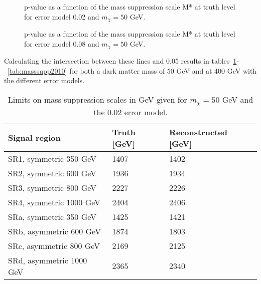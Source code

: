  \begin{figure}[H] %
    \hfill
    \caption{p-value as a function of the mass suppression scale M* at truth level for error model 0.02 and $m_{\chi}=50$ GeV.}
    \label{fig:SRnewMt}
  \end{figure}
\newpage
 \begin{figure}[H] %
    \hfill
    \caption{p-value as a function of the mass suppression scale M* at truth level for error model 0.08 and $m_{\chi}=50$ GeV.}
    \label{fig:SRnewMr}
  \end{figure}

Calculating the intersection between these lines and 0.05 results in tables~\ref{tab:masssupp002}-~\ref{tab:masssupp2010} for both a dark matter mass of 50 GeV and at 400 GeV with the different error models.

\begin{table}[ht]
\begin{center}
\begin{tabular}{|l|l|l|}
\hline
Signal region & Truth [GeV]& Reconstructed [GeV]\\ \hline
SR1, symmetric 350 GeV &1407&1402\\
SR2, symmetric 600 GeV&1936&1934\\
SR3, symmetric 800 GeV&2227&2226\\
SR4, symmetric 1000 GeV&2404&2406\\ \hline
SRa, symmetric 350 GeV &1425&1421\\
SRb, asymmetric 600 GeV &1874&1803\\
SRc, asymmetric 800 GeV&2169&2125\\
SRd, asymmetric 1000 GeV&2365&2340\\ \hline
\end{tabular}
\caption{Limits on mass suppression scales in GeV given for $m_{\chi}=50$ GeV and the 0.02 error model.}
\label{tab:masssupp002}
\end{center}
\end{table}

